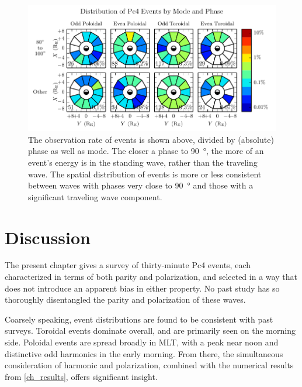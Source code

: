 \begin{figure}[!htb]
  \centering
  \includegraphics[width=\textwidth]{figures/mode_phase.pdf}
  \caption[Rate of Pc4 Events by Mode and Phase]{
    The observation rate of events is shown above, divided by (absolute) phase
    as well as mode. The closer a phase to \SI{90}{\degree}, the more of an
    event's energy is in the standing wave, rather than the traveling wave. The
    spatial distribution of events is more or less consistent between waves
    with phases very close to \SI{90}{\degree} and those with a significant
    traveling wave component. 
  }
  \label{fig_mode_phase}
\end{figure}

\section{Discussion}

The present chapter gives a survey of  thirty-minute Pc4 events, each
characterized in terms of both parity and polarization, and selected in a way
that does not introduce an apparent bias in either property. No past study has
so thoroughly disentangled the parity and polarization of these waves.

Coarsely speaking, event distributions are found to be consistent with past
surveys. Toroidal events dominate overall, and are primarily seen on the
morning side. Poloidal events are spread broadly in MLT, with a peak near noon
and distinctive odd harmonics in the early morning. From there, the
simultaneous consideration of harmonic and polarization, combined with the
numerical results from \cref{ch_results}, offers significant insight. 

